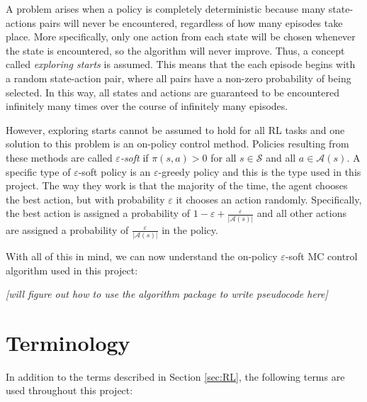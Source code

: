 \documentclass[11pt,a4paper]{report}
\begin{document}
A problem arises when a policy is completely deterministic because many state-actions pairs will never be encountered, regardless of how many episodes take place. More specifically, only one action from each state will be chosen whenever the state is encountered, so the algorithm will never improve. Thus, a concept called \emph{exploring starts} is assumed. This means that the each episode begins with a random state-action pair, where all pairs have a non-zero probability of being selected. In this way, all states and actions are guaranteed to be encountered infinitely many times over the course of infinitely many episodes.

However, exploring starts cannot be assumed to hold for all RL tasks and one solution to this problem is an on-policy control method. Policies resulting from these methods are called \emph{$\varepsilon$-soft} if $\pi(s,a) > 0$ for all $s \in \mathcal{S}$ and all $a \in \mathcal{A}(s)$. A specific type of $\varepsilon$-soft policy is an $\varepsilon$-greedy policy and this is the type used in this project. The way they work is that the majority of the time, the agent chooses the best action, but with probability $\varepsilon$ it chooses an action randomly. Specifically, the best action is assigned a probability of $1 - \varepsilon + \frac{\varepsilon}{|\mathcal{A}(s)|}$ and all other actions are assigned a probability of $\frac{\varepsilon}{|\mathcal{A}(s)|}$ in the policy.

With all of this in mind, we can now understand the on-policy $\varepsilon$-soft MC control algorithm used in this project:

\label{sec:monteCarloPseudocode}
\begin{center}
	\emph{[will figure out how to use the algorithm package to write pseudocode here]}
\end{center}


\section{Terminology}
\label{sec:Terminology}

In addition to the terms described in Section \ref{sec:RL}, the following terms are used throughout this project:
\end{document}
